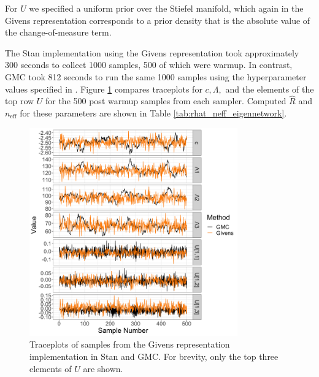 \documentclass[ba]{imsart}
\numberwithin{equation}{section}
\theoremstyle{plain}
\begin{document}
\noindent For $U$ we specified a uniform prior over the Stiefel manifold, which again in the Givens representation corresponds to a prior density that is the absolute value of the change-of-measure term.

\noindent The Stan implementation using the Givens representation took approximately 300 seconds to collect 1000 samples, 500 of which were warmup. In contrast, GMC took 812 seconds to run the same 1000 samples using the hyperparameter values specified in  \cite{byrne2013geodesic}. Figure \ref{fig:eigennetwork_traceplots} compares traceplots for $c, \Lambda,$ and the elements of the top row $U$ for the 500 post warmup samples from each sampler. Computed $\hat{R}$ and $n_{\mathrm{eff}}$ for these parameters are shown in Table \ref{tab:rhat_neff_eigennetwork}.

\begin{figure}[h]
\centering
\vspace{.1in}
\includegraphics[width=0.8\textwidth]{figures/eigennetwork_traceplots.png}
\vspace{.05in}
\caption{Traceplots of samples from the Givens representation implementation in Stan and GMC. For brevity, only the top three elements of $U$ are shown.}
\label{fig:eigennetwork_traceplots}
\end{figure}
\end{document}
